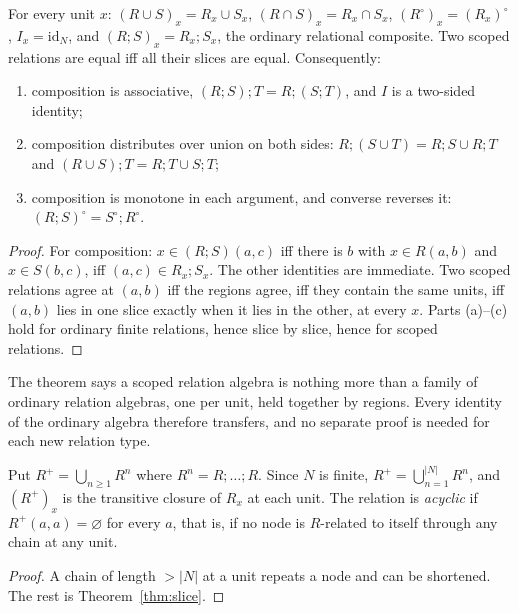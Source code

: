 \begin{theorem}\label{thm:slice}
For every unit $x$: $(R\cup S)_x=R_x\cup S_x$, $(R\cap S)_x=R_x\cap S_x$, $(R^\circ)_x=(R_x)^\circ$, $I_x=\mathrm{id}_N$, and $(R;S)_x=R_x;S_x$, the ordinary relational composite. Two scoped relations are equal iff all their slices are equal. Consequently:
\begin{enumerate}[label=(\alph*)]
\item composition is associative, $(R;S);T=R;(S;T)$, and $I$ is a two-sided identity;
\item composition distributes over union on both sides: $R;(S\cup T)=R;S\cup R;T$ and $(R\cup S);T=R;T\cup S;T$;
\item composition is monotone in each argument, and converse reverses it: $(R;S)^\circ=S^\circ;R^\circ$.
\end{enumerate}
\end{theorem}

\begin{proof}
For composition: $x\in(R;S)(a,c)$ iff there is $b$ with $x\in R(a,b)$ and $x\in S(b,c)$, iff $(a,c)\in R_x;S_x$. The other identities are immediate. Two scoped relations agree at $(a,b)$ iff the regions agree, iff they contain the same units, iff $(a,b)$ lies in one slice exactly when it lies in the other, at every $x$. Parts (a)--(c) hold for ordinary finite relations, hence slice by slice, hence for scoped relations.
\end{proof}

The theorem says a scoped relation algebra is nothing more than a family of ordinary relation algebras, one per unit, held together by regions. Every identity of the ordinary algebra therefore transfers, and no separate proof is needed for each new relation type.

\begin{corollary}\label{cor:closure}
Put $R^{+}=\bigcup_{n\ge1}R^{n}$ where $R^{n}=R;\dots;R$. Since $N$ is finite, $R^+=\bigcup_{n=1}^{|N|}R^n$, and $(R^+)_x$ is the transitive closure of $R_x$ at each unit. The relation is \emph{acyclic} if $R^+(a,a)=\varnothing$ for every $a$, that is, if no node is $R$-related to itself through any chain at any unit.
\end{corollary}

\begin{proof}
A chain of length $>|N|$ at a unit repeats a node and can be shortened. The rest is Theorem~\ref{thm:slice}.
\end{proof}

